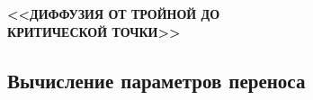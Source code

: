 \documentclass[pdf,hyperref={unicode}]{beamer}
\begin{document}
\subsection{ }


\begin{frame}
\begin{center}
\vspace{5mm}
\textbf{<<ДИФФУЗИЯ ОТ ТРОЙНОЙ ДО \\ КРИТИЧЕСКОЙ ТОЧКИ>>}
\end{center}
\end{frame}


\subsection{Вычисление параметров переноса}
\end{document}
